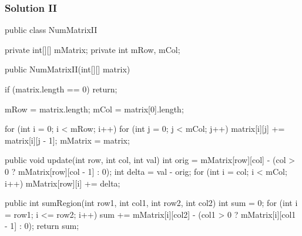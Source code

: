 \newpage

\subsubsection{Solution II}

\begin{Code}
public class NumMatrixII {
    private int[][] mMatrix;
    private int mRow, mCol;

    public NumMatrixII(int[][] matrix) {
        if (matrix.length == 0) {
            return;
        }

        mRow = matrix.length;
        mCol = matrix[0].length;

        for (int i = 0; i < mRow; i++) {
            for (int j = 0; j < mCol; j++) {
                matrix[i][j] += matrix[i][j - 1];
            }
        }
        mMatrix = matrix;
    }

    public void update(int row, int col, int val) {
        int orig = mMatrix[row][col] - (col > 0 ? mMatrix[row][col - 1] : 0);
        int delta = val - orig;
        for (int i = col; i < mCol; i++) {
            mMatrix[row][i] += delta;
        }
    }

    public int sumRegion(int row1, int col1, int row2, int col2) {
        int sum = 0;
        for (int i = row1; i <= row2; i++) {
            sum += mMatrix[i][col2] - (col1 > 0 ? mMatrix[i][col1 - 1] : 0);
        }
        return sum;
    }
}
\end{Code}

\newpage